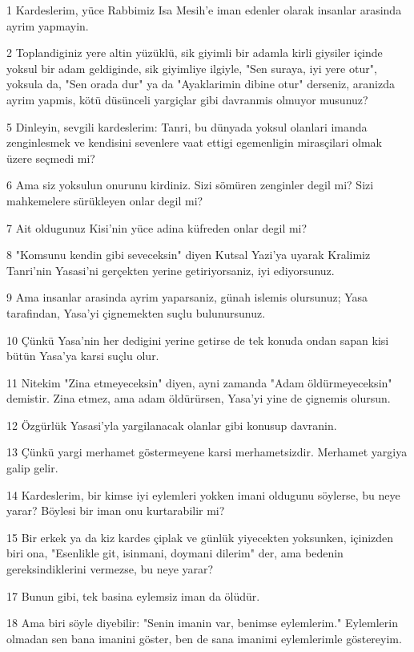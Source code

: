 \par 1 Kardeslerim, yüce Rabbimiz Isa Mesih'e iman edenler olarak insanlar arasinda ayrim yapmayin.
\par 2 Toplandiginiz yere altin yüzüklü, sik giyimli bir adamla kirli giysiler içinde yoksul bir adam geldiginde, sik giyimliye ilgiyle, "Sen suraya, iyi yere otur", yoksula da, "Sen orada dur" ya da "Ayaklarimin dibine otur" derseniz, aranizda ayrim yapmis, kötü düsünceli yargiçlar gibi davranmis olmuyor musunuz?
\par 5 Dinleyin, sevgili kardeslerim: Tanri, bu dünyada yoksul olanlari imanda zenginlesmek ve kendisini sevenlere vaat ettigi egemenligin mirasçilari olmak üzere seçmedi mi?
\par 6 Ama siz yoksulun onurunu kirdiniz. Sizi sömüren zenginler degil mi? Sizi mahkemelere sürükleyen onlar degil mi?
\par 7 Ait oldugunuz Kisi'nin yüce adina küfreden onlar degil mi?
\par 8 "Komsunu kendin gibi seveceksin" diyen Kutsal Yazi'ya uyarak Kralimiz Tanri'nin Yasasi'ni gerçekten yerine getiriyorsaniz, iyi ediyorsunuz.
\par 9 Ama insanlar arasinda ayrim yaparsaniz, günah islemis olursunuz; Yasa tarafindan, Yasa'yi çignemekten suçlu bulunursunuz.
\par 10 Çünkü Yasa'nin her dedigini yerine getirse de tek konuda ondan sapan kisi bütün Yasa'ya karsi suçlu olur.
\par 11 Nitekim "Zina etmeyeceksin" diyen, ayni zamanda "Adam öldürmeyeceksin" demistir. Zina etmez, ama adam öldürürsen, Yasa'yi yine de çignemis olursun.
\par 12 Özgürlük Yasasi'yla yargilanacak olanlar gibi konusup davranin.
\par 13 Çünkü yargi merhamet göstermeyene karsi merhametsizdir. Merhamet yargiya galip gelir.
\par 14 Kardeslerim, bir kimse iyi eylemleri yokken imani oldugunu söylerse, bu neye yarar? Böylesi bir iman onu kurtarabilir mi?
\par 15 Bir erkek ya da kiz kardes çiplak ve günlük yiyecekten yoksunken, içinizden biri ona, "Esenlikle git, isinmani, doymani dilerim" der, ama bedenin gereksindiklerini vermezse, bu neye yarar?
\par 17 Bunun gibi, tek basina eylemsiz iman da ölüdür.
\par 18 Ama biri söyle diyebilir: "Senin imanin var, benimse eylemlerim." Eylemlerin olmadan sen bana imanini göster, ben de sana imanimi eylemlerimle göstereyim.
